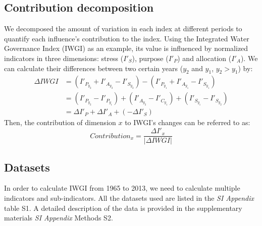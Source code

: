 	\subsection{Contribution decomposition}
		We decomposed the amount of variation in each index at different periods to quantify each influence's contribution to the index. Using the Integrated Water Governance Index (IWGI) as an example, its value is influenced by normalized indicators in three dimensions: stress ($I'_S$), purpose ($I'_P$) and allocation ($I'_A$). We can calculate their differences between two certain years ($y_2$ and $y_1$, $y_2 > y_1$) by:
		\begin{align}
		\Delta IWGI &= (I'_{P_{y_2}} + I'_{A_{y_2}} - I'_{S_{y_2}}) - (I'_{P_{y_1}} + I'_{A_{y_1}} - I'_{S_{y_1}}) \\
		&= (I'_{P_{y_2}} - I'_{P_{y_1}}) + (I'_{A_{y_2}} - I'_{C_{y_1}}) + (I'_{S_{y_1}} - I'_{S_{y_2}}) \\
		&= \Delta I'_P + \Delta I'_A + (-\Delta I'_S)
		\end{align}
		Then, the contribution of dimension $x$ to IWGI's changes can be referred to as:
		\begin{equation}
			Contribution_x = \frac{\Delta I'_x}{\lvert \Delta IWGI \rvert}
		\end{equation}



	\subsection{Datasets}
	In order to calculate IWGI from 1965 to 2013, we need to calculate multiple indicators and sub-indicators. All the datasets used are listed in the \textit{SI Appendix} table S1. A detailed description of the data is provided in the supplementary materials \textit{SI Appendix} Methods S2.
